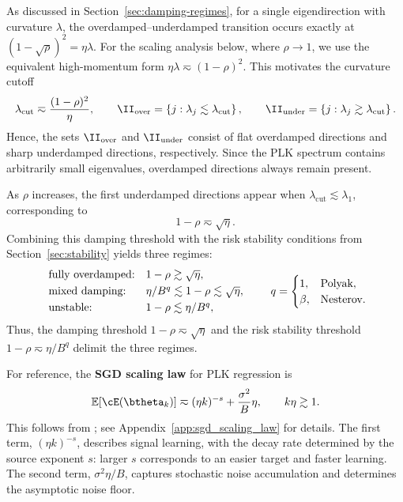 \documentclass[11pt]{article}
\begin{document}
As discussed in Section~\ref{sec:damping-regimes}, for a single eigendirection with curvature \(\lambda\), the overdamped--underdamped transition occurs exactly at
$
(1-\sqrt{\rho})^2=\eta\lambda.
$
For the scaling analysis below, where \(\rho\to1\), we use the equivalent high-momentum form
$
\eta\lambda\eqsim(1-\rho)^2.
$
This motivates the curvature cutoff
\[
\lambda_{\mathrm{cut}}
\eqsim
\frac{(1-\rho)^2}{\eta},
\qquad
\II_{\mathrm{over}}
=
\left\{
j:\lambda_j\lesssim\lambda_{\mathrm{cut}}
\right\},
\qquad
\II_{\mathrm{under}}
=
\left\{
j:\lambda_j\gtrsim\lambda_{\mathrm{cut}}
\right\}.
\]
Hence, the sets \(\II_{\mathrm{over}}\) and \(\II_{\mathrm{under}}\) consist of flat overdamped directions and sharp underdamped directions, respectively. Since the PLK spectrum contains arbitrarily small eigenvalues, overdamped directions always remain present.

As $\rho$ increases, the first underdamped directions appear when \(\lambda_{\mathrm{cut}}\lesssim \lambda_1\), corresponding to
\[
1-\rho\eqsim\sqrt{\eta}.
\]
Combining this damping threshold with the risk stability conditions from Section~\ref{sec:stability} yields three regimes:
\[
\begin{array}{lll}
\textnormal{fully overdamped:}
& 1-\rho\gtrsim\sqrt{\eta},\\[1mm]
\textnormal{mixed damping:}
& \eta/B^q\lesssim1-\rho\lesssim\sqrt{\eta},\\[1mm]
\textnormal{unstable:}
& 1-\rho\lesssim\eta/B^q,
\end{array}
\qquad
q=
\begin{cases}
1, & \textnormal{Polyak},\\
\beta, & \textnormal{Nesterov}.
\end{cases}
\]
Thus, the damping threshold \(1-\rho\eqsim\sqrt{\eta}\) and the risk stability threshold \(1-\rho\eqsim\eta/B^q\) delimit the three regimes.

For reference, the {\bf SGD scaling law} for PLK regression is
\begin{equation}
\label{eqn:scaling-law-sgd}
\mathbb E[\cE(\btheta_k)]\eqsim(\eta k)^{-s}+\frac{\sigma^2}{B}\eta,\qquad k\eta\gtrsim1.
\end{equation}
This follows from \citet[Theorem 5.2]{li2026functional}; see Appendix~\ref{app:sgd_scaling_law} for details. The first term, \((\eta k)^{-s}\), describes signal learning, with the decay rate determined by the source exponent \(s\): larger \(s\) corresponds to an easier target and faster learning. The second term, \(\sigma^2\eta/B\), captures stochastic noise accumulation and determines the asymptotic noise floor.
\end{document}
